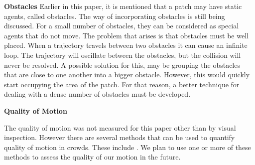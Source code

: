 \textbf{Obstacles}
Earlier in this paper, it is mentioned that a patch may have static agents, called obstacles. The way of incorporating obstacles is still being discussed. For a small number of obstacles, they can be considered as special agents that do not move. The problem that arises is that obstacles must be well placed. When a trajectory travels between two obstacles it can cause an infinite loop. The trajectory will oscillate between the obstacles, but the collision will never be resolved. A possible solution for this, may be grouping the obstacles that are close to one another into a bigger obstacle. However, this would quickly start occupying the area of the patch. For that reason, a better technique for dealing with a dense number of obstacles must be developed. 

\textbf{Quality of Motion}

The quality of motion was not measured for this paper other than by visual inspection. However there are several methods that can be used to quantify quality of motion in crowds. These include \note{(=====================)}. We plan to use one or more of these methods to assess the quality of our motion in the future.